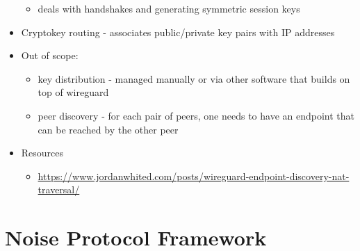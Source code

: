 \begin{itemize}
  \begin{itemize}
  \tightlist
  \item
    deals with handshakes and generating symmetric session keys
  \end{itemize}
\item
  Cryptokey routing - associates public/private key pairs with IP
  addresses
\item
  Out of scope:

  \begin{itemize}
  \tightlist
  \item
    key distribution - managed manually or via other software that
    builds on top of wireguard
  \item
    peer discovery - for each pair of peers, one needs to have an
    endpoint that can be reached by the other peer
  \end{itemize}
\item
  Resources

  \begin{itemize}
  \tightlist
  \item
    \url{https://www.jordanwhited.com/posts/wireguard-endpoint-discovery-nat-traversal/}
  \end{itemize}
\end{itemize}

\hypertarget{noise-protocol-framework}{%
\section{Noise Protocol Framework}\label{noise-protocol-framework}}


